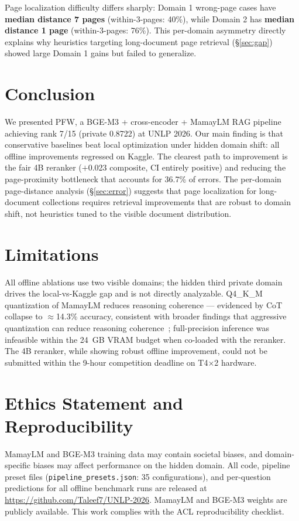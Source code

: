 \documentclass[11pt]{article}
\begin{document}
Page localization difficulty differs sharply: Domain 1 wrong-page cases have \textbf{median distance 7 pages} (within-3-pages: 40\%), while Domain 2 has \textbf{median distance 1 page} (within-3-pages: 76\%). This per-domain asymmetry directly explains why heuristics targeting long-document page retrieval (\S\ref{sec:gap}) showed large Domain 1 gains but failed to generalize.

\section{Conclusion}

We presented PFW, a BGE-M3 + cross-encoder + MamayLM RAG pipeline achieving rank 7/15 (private 0.8722) at UNLP 2026. Our main finding is that conservative baselines beat local optimization under hidden domain shift: all offline improvements regressed on Kaggle. The clearest path to improvement is the fair 4B reranker ($+$0.023 composite, CI entirely positive) and reducing the page-proximity bottleneck that accounts for 36.7\% of errors. The per-domain page-distance analysis (\S\ref{sec:error}) suggests that page localization for long-document collections requires retrieval improvements that are robust to domain shift, not heuristics tuned to the visible document distribution.



\appendix

\section*{Limitations}

All offline ablations use two visible domains; the hidden third private domain drives the local-vs-Kaggle gap and is not directly analyzable. Q4\_K\_M quantization of MamayLM reduces reasoning coherence — evidenced by CoT collapse to $\approx$14.3\% accuracy, consistent with broader findings that aggressive quantization can reduce reasoning coherence~\cite{dettmers2023qlora}; full-precision inference was infeasible within the 24~GB VRAM budget when co-loaded with the reranker. The 4B reranker, while showing robust offline improvement, could not be submitted within the 9-hour competition deadline on T4$\times$2 hardware.

\section*{Ethics Statement and Reproducibility}

MamayLM and BGE-M3 training data may contain societal biases, and domain-specific biases may affect performance on the hidden domain. All code, pipeline preset files (\texttt{pipeline\_presets.json}: 35 configurations), and per-question predictions for all offline benchmark runs are released at \url{https://github.com/Taleef7/UNLP-2026}. MamayLM and BGE-M3 weights are publicly available. This work complies with the ACL reproducibility checklist.
\end{document}
